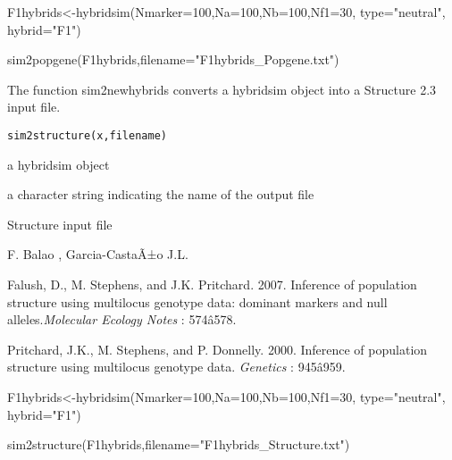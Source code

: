 \documentclass[letterpaper]{book}
\begin{document}
%
\begin{Examples}
\begin{ExampleCode}
F1hybrids<-hybridsim(Nmarker=100,Na=100,Nb=100,Nf1=30, type="neutral", hybrid="F1")

sim2popgene(F1hybrids,filename="F1hybrids_Popgene.txt")
\end{ExampleCode}
\end{Examples}
%
\begin{Description}\relax
The function sim2newhybrids converts a hybridsim object into a Structure 2.3 input file. 

\end{Description}
%
\begin{Usage}
\begin{verbatim}
sim2structure(x,filename)

\end{verbatim}
\end{Usage}
%
\begin{Arguments}
\begin{ldescription}

\item[\code{x}] 
a hybridsim object

\item[\code{filename}] 
a character string indicating the name of the output file
\end{ldescription}
\end{Arguments}
%
\begin{Value}
Structure input file
\end{Value}
%
\begin{Author}\relax
F. Balao , Garcia-CastaÃ±o J.L.
\end{Author}
%
\begin{References}\relax
Falush, D., M. Stephens, and J.K. Pritchard. 2007. Inference of population structure using multilocus genotype data: dominant markers and null alleles.\emph{Molecular Ecology Notes} : 574â578. 

Pritchard, J.K., M. Stephens, and P. Donnelly. 2000. Inference of population structure using multilocus genotype data. \emph{Genetics} : 945â959.
\end{References}
%
\begin{SeeAlso}\relax
{}
\end{SeeAlso}
%
\begin{Examples}
\begin{ExampleCode}
F1hybrids<-hybridsim(Nmarker=100,Na=100,Nb=100,Nf1=30, type="neutral", hybrid="F1")

sim2structure(F1hybrids,filename="F1hybrids_Structure.txt")
\end{ExampleCode}
\end{Examples}
\printindex{}
\end{document}
